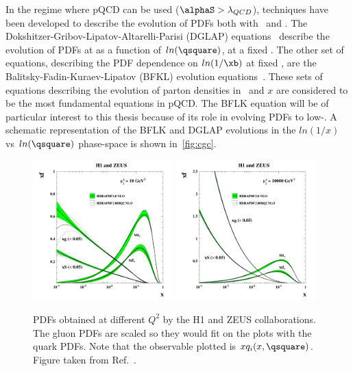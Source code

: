 In the regime where pQCD can be used ($\alphaS > \lambda_{QCD}$), techniques have been developed to describe the evolution of PDFs both with \xb\ and \qsquare. The Dokshitzer-Gribov-Lipatov-Altarelli-Parisi (DGLAP) equations~\cite{Gribov:1972rt,Gribov:1972ri,Dokshitzer:1977sg,Altarelli:1977zs} describe the evolution of PDFs at as a function of $ln(\qsquare)$, at a fixed \xb. The other set of equations, describing the PDF dependence on $ln(1/\xb)$ at fixed \qsquare, are the Balitsky-Fadin-Kuraev-Lipatov (BFKL) evolution equations~\cite{Balitsky:1978ic, Kuraev:1977fs, Fadin:1975cb, Lipatov:1976zz}. These sets of equations describing the evolution of parton densities in \qsquare\ and $x$ are considered to be the most fundamental equations in pQCD. The BFLK equation will be of particular interest to this thesis because of its role in evolving PDFs to low-\xb. A schematic representation of the BFLK and DGLAP evolutions in the $ln(1/x)$ vs $ln(\qsquare)$ phase-space is shown in~\ref{fig:cgc}.

\begin{figure}
	\centering
	\includegraphics[width=0.48\textwidth]{figures/d15-039f54a.pdf} 
	\includegraphics[width=0.48\textwidth]{figures/d15-039f55a.pdf} 
	\caption{PDFs obtained at different $Q^{2}$ by the H1 and ZEUS collaborations. The gluon PDFs are scaled so they would fit on the plots with the quark PDFs. Note that the observable plotted is $xq_{i}(x,\qsquare)$. Figure taken from Ref.~\cite{Abramowicz:2015mha}.}	
	\label{fig:pdfsintro}
\end{figure}

